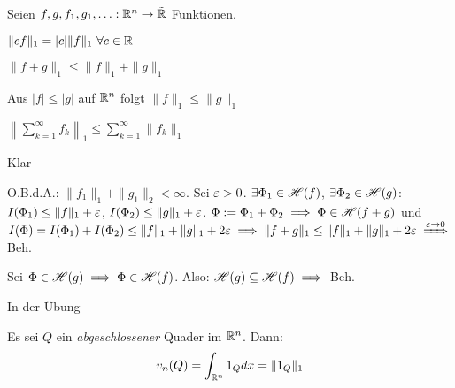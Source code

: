 \documentclass[a4paper,twoside,DIV15,BCOR12mm]{scrbook}
\begin{document}
\begin{satz}
Seien $f,g,f_1,g_1,\ldots: \mathbb{R}^n\to \tilde{\mathbb{R}}$ Funktionen.
\begin{liste}
\item $\|cf\|_1 = |c| \|f\|_1 \ \forall c\in\mathbb{R}$
\item $\|f+g\|_1 \le \|f\|_1 + \|g\|_1$
\item Aus $|f|\le |g|$ auf $\mathbb{R}^n$ folgt $\|f\|_1 \le\|g\|_1$
\item $\left\|\sum_{k=1}^\infty f_k \right\|_1 \le \sum_{k=1}^\infty \|f_k\|_1$
\end{liste}
\end{satz}

\begin{beweise}
\item Klar
\item O.B.d.A.: $\|f_1\|_1 + \|g_1\|_2 < \infty$. Sei $\varepsilon >0$. $\exists \Phi_1 \in \mathscr{H}(f)$, $\exists \Phi_2\in\mathscr{H}(g)$: $I(\Phi_1)\le \|f\|_1 + \varepsilon$, $I(\Phi_2) \le \|g\|_1 + \varepsilon$. $\Phi:= \Phi_1+ \Phi_2 \implies \Phi \in \mathscr{H}(f+g)$ und $I(\Phi) = I(\Phi_1) + I(\Phi_2) \le \|f\|_1 + \|g\|_1 + 2\ep \folgt \|f+g\|_1 \le \|f\|_1 + \|g\|_1 + 2\ep \folgtwegen{\ep \to 0}$ Beh.
\item Sei $\Phi \in \mathscr{H}(g) \implies \Phi\in \mathscr{H}(f)$. Also: $\mathscr{H}(g)\subseteq \mathscr{H}(f) \implies$ Beh.
\item In der Übung
\end{beweise}

\begin{satz}
Es sei $Q$ ein \emph{abgeschlossener} Quader im $\mathbb{R}^n$. Dann: 
$$v_n(Q) = \int_{\mathbb{R}^n} 1_Q dx = \|1_Q\|_1$$
\end{satz}
\end{document}

